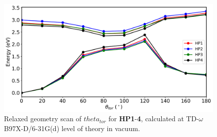 \begin{figure}[H]
\centering
  \includegraphics[width=0.9\linewidth]{5ConnectingCrystalStructure/2HP_scan_vac.pdf}
  \caption[Relaxed geometry scan of $theta_{tor}$ for \textbf{HP} derivatives]{Relaxed geometry scan of $theta_{tor}$ for \textbf{HP1}-\textbf{4}, calculated at TD-$\omega$B97X-D/6-31G(d) level of theory in vacuum.}
  \label{figure: HP_scan_vac}
\end{figure}

